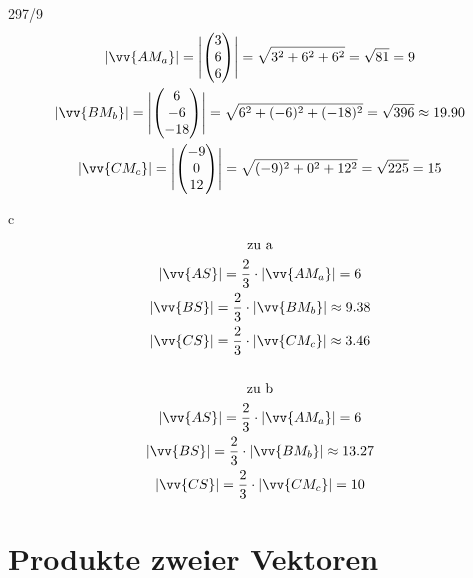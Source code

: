 \begin{exercise}{297/9}
\begin{gather*}
    |\vv{AM_a}| = \Biggl|\begin{pmatrix}3 \\ 6 \\ 6\end{pmatrix}\Biggr| = \sqrt{3^2 + 6^2 + 6^2} = \sqrt{81} = 9 \\
    |\vv{BM_b}| = \Biggl|\begin{pmatrix}6 \\ -6 \\ -18\end{pmatrix}\Biggr| = \sqrt{6^2 + (-6)^2 + (-18)^2} = \sqrt{396} \approx 19.90 \\
    |\vv{CM_c}| = \Biggl|\begin{pmatrix}-9 \\ 0 \\ 12\end{pmatrix}\Biggr| = \sqrt{(-9)^2 + 0^2 + 12^2} = \sqrt{225} = 15
  \end{gather*}
  \item [c]
  \begin{gather*}
    \text{zu a} \\
    |\vv{AS}| = \frac{2}{3} \cdot |\vv{AM_a}| = 6 \\
    |\vv{BS}| = \frac{2}{3} \cdot |\vv{BM_b}| \approx 9.38 \\
    |\vv{CS}| = \frac{2}{3} \cdot |\vv{CM_c}| \approx 3.46 \\\\
    \text{zu b} \\
    |\vv{AS}| = \frac{2}{3} \cdot |\vv{AM_a}| = 6 \\
    |\vv{BS}| = \frac{2}{3} \cdot |\vv{BM_b}| \approx 13.27 \\
    |\vv{CS}| = \frac{2}{3} \cdot |\vv{CM_c}| = 10
  \end{gather*}
\end{exercise}
\section{Produkte zweier Vektoren}
